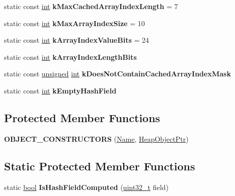 \begin{DoxyCompactItemize}
static const \mbox{\hyperlink{classint}{int}} {\bfseries k\+Max\+Cached\+Array\+Index\+Length} = 7
\item 
\mbox{\label{classv8_1_1internal_1_1Name_a5f8fc3c26245e7d8971471bf8dabe7da}} 
static const \mbox{\hyperlink{classint}{int}} {\bfseries k\+Max\+Array\+Index\+Size} = 10
\item 
\mbox{\label{classv8_1_1internal_1_1Name_ac253c758f54e8ac0708b4b647ebbe9f8}} 
static const \mbox{\hyperlink{classint}{int}} {\bfseries k\+Array\+Index\+Value\+Bits} = 24
\item 
static const \mbox{\hyperlink{classint}{int}} {\bfseries k\+Array\+Index\+Length\+Bits}
\item 
static const \mbox{\hyperlink{classunsigned}{unsigned}} \mbox{\hyperlink{classint}{int}} {\bfseries k\+Does\+Not\+Contain\+Cached\+Array\+Index\+Mask}
\item 
static const \mbox{\hyperlink{classint}{int}} {\bfseries k\+Empty\+Hash\+Field}
\end{DoxyCompactItemize}
\subsection*{Protected Member Functions}
\begin{DoxyCompactItemize}
\item 
\mbox{\label{classv8_1_1internal_1_1Name_a8fdec1a982ee16320326cc3dd45bbb72}} 
{\bfseries O\+B\+J\+E\+C\+T\+\_\+\+C\+O\+N\+S\+T\+R\+U\+C\+T\+O\+RS} (\mbox{\hyperlink{classv8_1_1internal_1_1Name}{Name}}, \mbox{\hyperlink{classv8_1_1internal_1_1HeapObjectPtr}{Heap\+Object\+Ptr}})
\end{DoxyCompactItemize}
\subsection*{Static Protected Member Functions}
\begin{DoxyCompactItemize}
\item 
\mbox{\label{classv8_1_1internal_1_1Name_a9b9b29b11d96f3345cbee8f6e5b45465}} 
static \mbox{\hyperlink{classbool}{bool}} {\bfseries Is\+Hash\+Field\+Computed} (\mbox{\hyperlink{classuint32__t}{uint32\+\_\+t}} field)
\end{DoxyCompactItemize}
